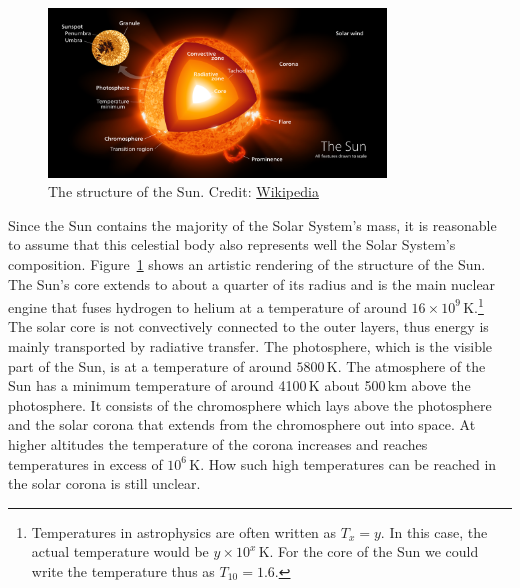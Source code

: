 \begin{figure}[tb]
    \centering
    \includegraphics[width=0.8\textwidth]{graphics/solar_system_abundances/sun_structure}
    \caption{The structure of the Sun. Credit: \href{https://en.wikipedia.org/wiki/Sun}{Wikipedia}}
    \label{fig:Sun_structure}
\end{figure}
Since the Sun contains the majority of the Solar System's mass, it is reasonable to assume that this celestial body also represents well the Solar System's composition. Figure~\ref{fig:Sun_structure} shows an artistic rendering of the structure of the Sun. The Sun's core extends to about a quarter of its radius and is the main nuclear engine that fuses hydrogen to helium at a temperature of around $16\times10^{9}$\,K.\footnote{Temperatures in astrophysics are often written as $T_x = y$. In this case, the actual temperature would be $y\times10^{x}$\,K. For the core of the Sun we could write the temperature thus as $T_{10} = 1.6$.} The solar core is not convectively connected to the outer layers, thus energy is mainly transported by radiative transfer. The photosphere, which is the visible part of the Sun, is at a temperature of around $5800$\,K. The atmosphere of the Sun has a minimum temperature of around 4100\,K about 500\,km above the photosphere. It consists of the chromosphere which lays above the photosphere and the solar corona that extends from the chromosphere out into space. At higher altitudes the temperature of the corona increases and reaches temperatures in excess of $10^6$\,K. How such high temperatures can be reached in the solar corona is still unclear.



